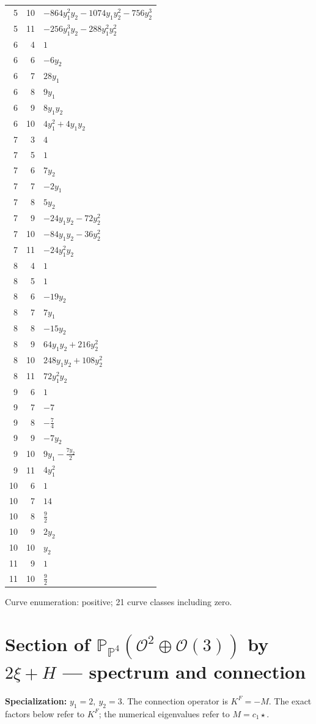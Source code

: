 \documentclass[10pt,a4paper]{article}
\begin{document}
{\begin{longtable}{rrp{125mm}}
5 & 10 & $- 864 y_{1}^{2} y_{2} - 1074 y_{1} y_{2}^{2} - 756 y_{2}^{3}$\\
5 & 11 & $- 256 y_{1}^{3} y_{2} - 288 y_{1}^{2} y_{2}^{2}$\\
6 & 4 & $1$\\
6 & 6 & $- 6 y_{2}$\\
6 & 7 & $28 y_{1}$\\
6 & 8 & $9 y_{1}$\\
6 & 9 & $8 y_{1} y_{2}$\\
6 & 10 & $4 y_{1}^{2} + 4 y_{1} y_{2}$\\
7 & 3 & $4$\\
7 & 5 & $1$\\
7 & 6 & $7 y_{2}$\\
7 & 7 & $- 2 y_{1}$\\
7 & 8 & $5 y_{2}$\\
7 & 9 & $- 24 y_{1} y_{2} - 72 y_{2}^{2}$\\
7 & 10 & $- 84 y_{1} y_{2} - 36 y_{2}^{2}$\\
7 & 11 & $- 24 y_{1}^{2} y_{2}$\\
8 & 4 & $1$\\
8 & 5 & $1$\\
8 & 6 & $- 19 y_{2}$\\
8 & 7 & $7 y_{1}$\\
8 & 8 & $- 15 y_{2}$\\
8 & 9 & $64 y_{1} y_{2} + 216 y_{2}^{2}$\\
8 & 10 & $248 y_{1} y_{2} + 108 y_{2}^{2}$\\
8 & 11 & $72 y_{1}^{2} y_{2}$\\
9 & 6 & $1$\\
9 & 7 & $-7$\\
9 & 8 & $- \frac{7}{4}$\\
9 & 9 & $- 7 y_{2}$\\
9 & 10 & $9 y_{1} - \frac{7 y_{2}}{2}$\\
9 & 11 & $4 y_{1}^{2}$\\
10 & 6 & $1$\\
10 & 7 & $14$\\
10 & 8 & $\frac{9}{2}$\\
10 & 9 & $2 y_{2}$\\
10 & 10 & $y_{2}$\\
11 & 9 & $1$\\
11 & 10 & $\frac{9}{2}$\\
\end{longtable}}
Curve enumeration: positive; 21 curve classes including zero.
\clearpage\section*{Section of $\mathbb P_{\mathbb P^{4}}(\mathcal O^{2}\oplus \mathcal O(3))$ by $2\xi +H$ --- spectrum and connection}
\textbf{Specialization:} $y_1=2,\ y_2=3$. The connection operator is $K^F=-M$. The exact factors below refer to $K^F$; the numerical eigenvalues refer to $M=c_1\star$.
\end{document}
